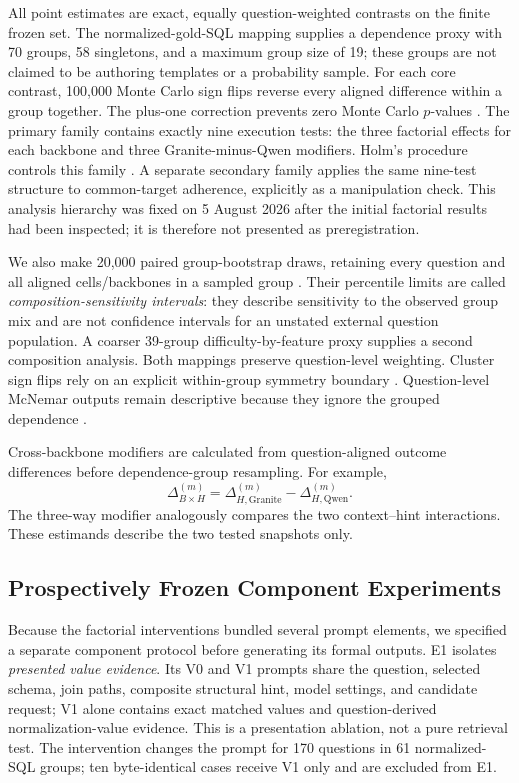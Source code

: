 \documentclass[applsci,article,submit,moreauthors]{Definitions/mdpi}
\begin{document}
All point estimates are exact, equally question-weighted contrasts on the finite frozen set. The normalized-gold-SQL mapping supplies a dependence proxy with 70 groups, 58 singletons, and a maximum group size of 19; these groups are not claimed to be authoring templates or a probability sample. For each core contrast, 100,000 Monte Carlo sign flips reverse every aligned difference within a group together. The plus-one correction prevents zero Monte Carlo $p$-values \cite{phipson2010permutation}. The primary family contains exactly nine execution tests: the three factorial effects for each backbone and three Granite-minus-Qwen modifiers. Holm's procedure controls this family \cite{holm1979simple}. A separate secondary family applies the same nine-test structure to common-target adherence, explicitly as a manipulation check. This analysis hierarchy was fixed on 5 August 2026 after the initial factorial results had been inspected; it is therefore not presented as preregistration.

We also make 20,000 paired group-bootstrap draws, retaining every question and all aligned cells/backbones in a sampled group \cite{efron1979bootstrap,cameron2008bootstrap}. Their percentile limits are called \emph{composition-sensitivity intervals}: they describe sensitivity to the observed group mix and are not confidence intervals for an unstated external question population. A coarser 39-group difficulty-by-feature proxy supplies a second composition analysis. Both mappings preserve question-level weighting. Cluster sign flips rely on an explicit within-group symmetry boundary \cite{canay2017randomization}. Question-level McNemar outputs remain descriptive because they ignore the grouped dependence \cite{mcnemar1947note}.

Cross-backbone modifiers are calculated from question-aligned outcome differences before dependence-group resampling. For example,
\begin{equation}
\Delta_{B\times H}^{(m)}=\Delta_{H,\mathrm{Granite}}^{(m)}
-\Delta_{H,\mathrm{Qwen}}^{(m)}.
\end{equation}
The three-way modifier analogously compares the two context--hint interactions. These estimands describe the two tested snapshots only.

\subsection{Prospectively Frozen Component Experiments}
Because the factorial interventions bundled several prompt elements, we specified a separate component protocol before generating its formal outputs. E1 isolates \emph{presented value evidence}. Its V0 and V1 prompts share the question, selected schema, join paths, composite structural hint, model settings, and candidate request; V1 alone contains exact matched values and question-derived normalization-value evidence. This is a presentation ablation, not a pure retrieval test. The intervention changes the prompt for 170 questions in 61 normalized-SQL groups; ten byte-identical cases receive V1 only and are excluded from E1.
\end{document}
